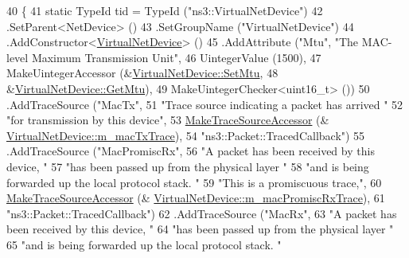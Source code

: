 \begin{DoxyCode}
40 \{
41   \textcolor{keyword}{static} TypeId tid = TypeId (\textcolor{stringliteral}{"ns3::VirtualNetDevice"})
42     .SetParent<NetDevice> ()
43     .SetGroupName (\textcolor{stringliteral}{"VirtualNetDevice"})
44     .AddConstructor<\hyperlink{classns3_1_1VirtualNetDevice_ab77801a18776a510358ed65a76d81467}{VirtualNetDevice}> ()
45     .AddAttribute (\textcolor{stringliteral}{"Mtu"}, \textcolor{stringliteral}{"The MAC-level Maximum Transmission Unit"},
46                    UintegerValue (1500),
47                    MakeUintegerAccessor (&\hyperlink{classns3_1_1VirtualNetDevice_a3277a3167e1519924a3bcdf795314178}{VirtualNetDevice::SetMtu},
48                                          &\hyperlink{classns3_1_1VirtualNetDevice_a9f0f1def1c49995cce47321bd78f1063}{VirtualNetDevice::GetMtu}),
49                    MakeUintegerChecker<uint16\_t> ())
50     .AddTraceSource (\textcolor{stringliteral}{"MacTx"}, 
51                      \textcolor{stringliteral}{"Trace source indicating a packet has arrived "}
52                      \textcolor{stringliteral}{"for transmission by this device"},
53                      \hyperlink{group__tracing_gab21a770b9855af4e8f69f7531ea4a6b0}{MakeTraceSourceAccessor} (&
      \hyperlink{classns3_1_1VirtualNetDevice_af893adb92d8bef8af0b47a3a798a2003}{VirtualNetDevice::m\_macTxTrace}),
54                      \textcolor{stringliteral}{"ns3::Packet::TracedCallback"})
55     .AddTraceSource (\textcolor{stringliteral}{"MacPromiscRx"}, 
56                      \textcolor{stringliteral}{"A packet has been received by this device, "}
57                      \textcolor{stringliteral}{"has been passed up from the physical layer "}
58                      \textcolor{stringliteral}{"and is being forwarded up the local protocol stack.  "}
59                      \textcolor{stringliteral}{"This is a promiscuous trace,"},
60                      \hyperlink{group__tracing_gab21a770b9855af4e8f69f7531ea4a6b0}{MakeTraceSourceAccessor} (&
      \hyperlink{classns3_1_1VirtualNetDevice_a978beda53d5a1309d1fff0cbfb3137b6}{VirtualNetDevice::m\_macPromiscRxTrace}),
61                      \textcolor{stringliteral}{"ns3::Packet::TracedCallback"})
62     .AddTraceSource (\textcolor{stringliteral}{"MacRx"}, 
63                      \textcolor{stringliteral}{"A packet has been received by this device, "}
64                      \textcolor{stringliteral}{"has been passed up from the physical layer "}
65                      \textcolor{stringliteral}{"and is being forwarded up the local protocol stack.  "}

\end{DoxyCode}
